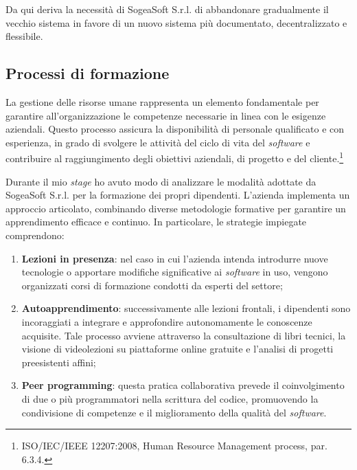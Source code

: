         \noindent Da qui deriva la necessità di SogeaSoft S.r.l. di abbandonare gradualmente il vecchio sistema in favore di un nuovo sistema più documentato, decentralizzato e flessibile. 
        
        \subsection{Processi di formazione}
        
        La gestione delle risorse umane rappresenta un elemento fondamentale per garantire all'organizzazione le competenze necessarie in linea con le esigenze aziendali. Questo processo assicura la disponibilità di personale qualificato e con esperienza, in grado di svolgere le attività del ciclo di vita del \textit{software} e contribuire al raggiungimento degli obiettivi aziendali, di progetto e del cliente.\footnote{ISO/IEC/IEEE 12207:2008, Human Resource Management process, par. 6.3.4.}

        \noindent Durante il mio \textit{stage} ho avuto modo di analizzare le modalità adottate da SogeaSoft S.r.l. per la formazione dei propri dipendenti. L'azienda implementa un approccio articolato, combinando diverse metodologie formative per garantire un apprendimento efficace e continuo. In particolare, le strategie impiegate comprendono:

        \begin{enumerate}
        \item \textbf{Lezioni in presenza}: nel caso in cui l’azienda intenda introdurre nuove tecnologie o apportare modifiche significative ai \textit{software} in uso, vengono organizzati corsi di formazione condotti da esperti del settore;

        \item \textbf{Autoapprendimento}: successivamente alle lezioni frontali, i dipendenti sono incoraggiati a integrare e approfondire autonomamente le conoscenze acquisite. Tale processo avviene attraverso la consultazione di libri tecnici, la visione di videolezioni su piattaforme online gratuite e l’analisi di progetti preesistenti affini;

        \item \textbf{Peer programming}: questa pratica collaborativa prevede il coinvolgimento di due o più programmatori nella scrittura del codice, promuovendo la condivisione di competenze e il miglioramento della qualità del \textit{software}.
        \end{enumerate}
        
